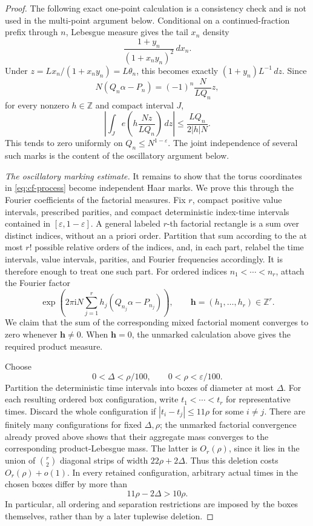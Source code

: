 \documentclass[11pt]{article}
\numberwithin{equation}{section}
\theoremstyle{definition}
\newcommand{\Z}{\mathbb Z}
\newcommand{\1}{\mathbf 1}
\newcommand{\ii}{\mathrm i}
\begin{document}
\begin{proof}
The following exact one-point calculation is a consistency check and is
not used in the multi-point argument below.  Conditional on a
continued-fraction prefix through \(n\), Lebesgue measure gives the
tail \(x_n\) density
\[
 \frac{1+y_n}{(1+x_ny_n)^2}\,dx_n.
\]
Under \(z=Lx_n/(1+x_ny_n)=L\theta_n\), this becomes exactly
\((1+y_n)L^{-1}\,dz\).  Since
\[
 N(Q_n\alpha-P_n)=(-1)^n\frac{N}{LQ_n}z,
\]
for every nonzero \(h\in\Z\) and compact interval \(J\),
\[
 \left|\int_J e\left(h\frac{Nz}{LQ_n}\right)\,dz\right|
 \le \frac{LQ_n}{2|h|N}.
\]
This tends to zero uniformly on \(Q_n\le N^{1-\varepsilon}\).
The joint independence of several such marks is the content of the
oscillatory argument below.

\emph{The oscillatory marking estimate.}
It remains to show that the torus coordinates in
\eqref{eq:cf-process} become independent Haar marks.  We prove this
through the Fourier coefficients of the factorial measures.
Fix \(r\), compact positive value intervals, prescribed parities, and
compact deterministic index-time intervals contained in
\([\varepsilon,1-\varepsilon]\).  A general labeled \(r\)-th
factorial rectangle is a sum over distinct indices, without an a priori
order.  Partition that sum according to the at most \(r!\) possible
relative orders of the indices, and, in each part, relabel the time
intervals, value intervals, parities, and Fourier frequencies
accordingly.  It is therefore enough to treat one such part.  For
ordered indices
\(n_1<\cdots<n_r\), attach the Fourier factor
\begin{equation}\label{eq:joint-mark-character}
 \exp\left(2\pi\ii N
 \sum_{j=1}^rh_j(Q_{n_j}\alpha-P_{n_j})\right),
 \qquad \mathbf h=(h_1,\ldots,h_r)\in\Z^r.
\end{equation}
We claim that the sum of the corresponding mixed factorial moment
converges to zero whenever \(\mathbf h\ne0\).  When
\(\mathbf h=0\), the unmarked calculation above gives the required
product measure.

Choose
\begin{equation}\label{eq:parameter-hierarchy}
 0<\Delta<\rho/100,\qquad 0<\rho<\varepsilon/100.
\end{equation}
Partition the deterministic time intervals into boxes of diameter at
most \(\Delta\).  For each resulting ordered box configuration, write
\(t_1<\cdots<t_r\) for representative times.  Discard the whole
configuration if \(|t_i-t_j|\le11\rho\) for some \(i\ne j\).
There are finitely many configurations for fixed \(\Delta,\rho\);
the unmarked factorial convergence already proved above shows that
their aggregate mass converges to the corresponding product-Lebesgue
mass.  The latter is \(O_r(\rho)\), since it lies in the union of
\(\binom r2\) diagonal strips of width \(22\rho+2\Delta\).
Thus this deletion costs \(O_r(\rho)+o(1)\).  In every retained
configuration, arbitrary actual times in the chosen boxes differ by
more than
\[
 11\rho-2\Delta>10\rho.
\]
In particular, all ordering and separation restrictions are imposed
by the boxes themselves, rather than by a later tuplewise deletion.


\end{proof}
\end{document}
